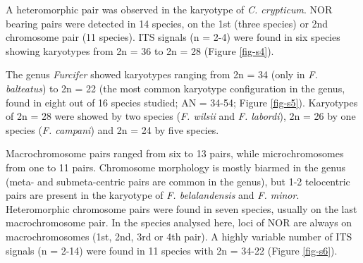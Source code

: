 \documentclass[a4paper, 12pt]{article}
\begin{document}
\noindent A heteromorphic pair was observed in the karyotype of \textit{C. crypticum}. 
NOR bearing pairs were detected in 14 species, on the 1st (three species) or 2nd chromosome pair (11 species). 
ITS signals (n = 2-4) were found in six species showing karyotypes from 2n = 36 to 2n = 28 (Figure \ref{fig-s4}).

\noindent The genus \textit{Furcifer} showed karyotypes ranging from 2n = 34 (only in \textit{F. balteatus}) to 2n = 22 (the most common karyotype configuration in the genus, found in eight out of 16 species studied; AN = 34-54; Figure \ref{fig-s5}). 
Karyotypes of 2n = 28 were showed by two species (\textit{F. wilsii} and \textit{F. labordi}), 2n = 26 by one species (\textit{F. campani}) and 2n = 24 by five species. 

\noindent Macrochromosome pairs ranged from six to 13 pairs, while microchromosomes from one to 11 pairs. 
Chromosome morphology is mostly biarmed in the genus (meta- and submeta-centric pairs are common in the genus), but 1-2 telocentric pairs are present in the karyotype of \textit{F. belalandensis} and \textit{F. minor}.
Heteromorphic chromosome pairs were found in seven species, usually on the last macrochromosome pair. 
In the species analysed here, loci of NOR are always on macrochromosomes (1st, 2nd, 3rd or 4th pair). 
A highly variable number of ITS signals (n = 2-14) were found in 11 species with 2n = 34-22 (Figure \ref{fig-s6}).
\end{document}

